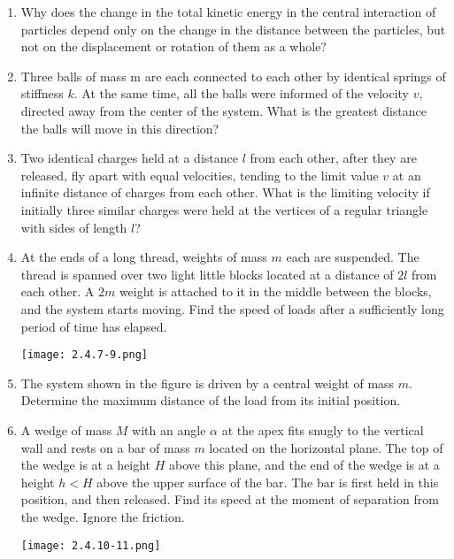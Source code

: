 \documentclass{article}
\begin{document}
\begin{enumerate}[label=2.4.\arabic*]
\item Why does the change in the total kinetic energy in the central interaction of particles depend only on the change in the distance between the particles, but not on the displacement or rotation of them as a whole?

\item Three balls of mass m are each connected to each other by identical springs of stiffness $k$. At the same time, all the balls were informed of the velocity $v$, directed away from the center of the system. What is the greatest distance the balls will move in this direction?

\item Two identical charges held at a distance $l$ from each other, after they are released, fly apart with equal velocities, tending to the limit value $v$ at an infinite distance of charges from each other. What is the limiting velocity if initially three similar charges were held at the vertices of a regular triangle with sides of length $l$?

\item At the ends of a long thread, weights of mass $m$ each are suspended. The thread is spanned over two light little blocks located at a distance of $2l$ from each other. A $2m$ weight is attached to it in the middle between the blocks, and the system starts moving. Find the speed of loads after a sufficiently long period of time has elapsed.

\begin{center}
    \texttt{[image: 2.4.7-9.png]}
\end{center}


\item The system shown in the figure is driven by a central weight of mass $m$. Determine the maximum distance of the load from its initial position.

\item A wedge of mass $M$ with an angle $\alpha$ at the apex fits snugly to the vertical wall and rests on a bar of mass $m$ located on the horizontal plane. The top of the wedge is at a height $H$ above this plane, and the end of the wedge is at a height $h < H$ above the upper surface of the bar. The bar is first held in this position, and then released. Find its speed at the moment of separation from the wedge. Ignore the friction.

\begin{center}
    \texttt{[image: 2.4.10-11.png]}
\end{center}



\end{enumerate}
\end{document}
